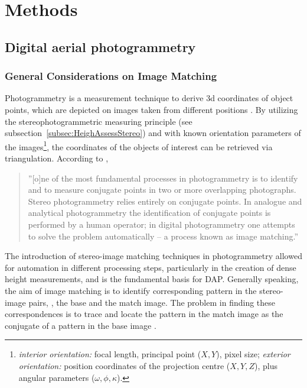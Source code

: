 \chapter{Methods}
\label{chp:Meth}

\section{Digital aerial photogrammetry}\label{sec:DAP}

\subsection{General Considerations on Image Matching}

Photogrammetry  is a measurement technique
to derive 3d coordinates of object points, which are depicted on 
images taken from different positions \parencite{Lemmens.2011b}.
By utilizing the stereophotogrammetric measuring principle (see subsection~\ref{subsec:HeighAssessStereo}) 
and with known orientation parameters of the images\footnote{\emph{interior orientation:} 
	focal length, principal point ($X, Y$), pixel size;
	\emph{exterior orientation:} position coordinates of the projection centre ($X, Y, Z$), 
	plus angular parameters ($\omega, \phi, \kappa$).},
 the coordinates of the objects of interest can be retrieved via triangulation.
According to \textcite[p. 231]{Schenk.1999}, 

\begin{quote}
”[o]ne 
of the most fundamental processes in photogrammetry
is to identify and to measure conjugate
points in two or more overlapping photographs.
Stereo photogrammetry relies entirely on conjugate
points. In analogue and analytical photogrammetry
the identification of conjugate points
is performed by a human operator; in digital photogrammetry
one attempts to solve the problem
automatically -- a process known as image matching.”
\end{quote}

\noindent The introduction of stereo-image matching techniques in photogrammetry allowed for automation in different processing steps, 
particularly in the creation of dense height measurements, and is the fundamental basis for \ac{DAP}.
Generally speaking, the aim of image matching is to identify corresponding pattern in the stereo-image pairs, 
\ie, the base and the match image. The problem in finding these correspondences is to trace and locate the pattern 
in the match image as the conjugate of a pattern in the base image \parencite{Lemmens.2011b}.

